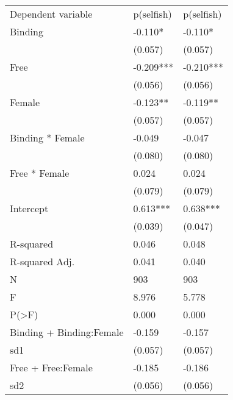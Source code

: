 \begin{tabular}{lll}
Dependent variable & p(selfish) & p(selfish) \\
Binding & -0.110* & -0.110* \\
 & (0.057) & (0.057) \\
Free & -0.209*** & -0.210*** \\
 & (0.056) & (0.056) \\
Female & -0.123** & -0.119** \\
 & (0.057) & (0.057) \\
Binding * Female & -0.049 & -0.047 \\
 & (0.080) & (0.080) \\
Free * Female & 0.024 & 0.024 \\
 & (0.079) & (0.079) \\
Intercept & 0.613*** & 0.638*** \\
 & (0.039) & (0.047) \\
R-squared & 0.046 & 0.048 \\
R-squared Adj. & 0.041 & 0.040 \\
N & 903 & 903 \\
F & 8.976 & 5.778 \\
P(>F) & 0.000 & 0.000 \\
Binding + Binding:Female & -0.159 & -0.157 \\
sd1 & (0.057) & (0.057) \\
Free + Free:Female & -0.185 & -0.186 \\
sd2 & (0.056) & (0.056) \\
\end{tabular}
